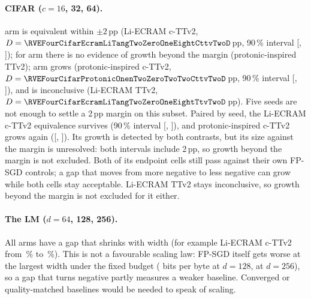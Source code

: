 \paragraph{CIFAR ($c=16$, 32, 64).} \RVEFourCifarNEquivalent{} arm is equivalent within $\pm2$\,pp (Li-ECRAM c-TTv2,
$D=\RVEFourCifarEcramLiTangTwoZeroOneEightCttvTwoD$\,pp, 90\,\% interval [\RVEFourCifarEcramLiTangTwoZeroOneEightCttvTwoLo,
\RVEFourCifarEcramLiTangTwoZeroOneEightCttvTwoHi]); for \RVEFourCifarNNoEvidenceOfGrowthBeyondTheMargin{} arm there is no evidence
of growth beyond the margin (protonic-inspired TTv2); \RVEFourCifarNGrows{} arm grows (protonic-inspired c-TTv2,
$D=\RVEFourCifarProtonicOnenTwoZeroTwoTwoCttvTwoD$\,pp, 90\,\% interval [\RVEFourCifarProtonicOnenTwoZeroTwoTwoCttvTwoLo,
\RVEFourCifarProtonicOnenTwoZeroTwoTwoCttvTwoHi]), and \RVEFourCifarNInconclusive{} is inconclusive (Li-ECRAM TTv2,
$D=\RVEFourCifarEcramLiTangTwoZeroOneEightTtvTwoD$\,pp).
Five seeds are not enough to settle a 2\,pp margin on this subset. Paired by seed, the Li-ECRAM c-TTv2 equivalence survives
(90\,\% interval [\RVEFourCifarEcramLiTangTwoZeroOneEightCttvTwoPairedLo, \RVEFourCifarEcramLiTangTwoZeroOneEightCttvTwoPairedHi]),
and protonic-inspired c-TTv2 grows again ([\RVEFourCifarProtonicOnenTwoZeroTwoTwoCttvTwoPairedLo,
\RVEFourCifarProtonicOnenTwoZeroTwoTwoCttvTwoPairedHi]). Its growth is detected by both contrasts, but its size against the
margin is unresolved: both intervals include 2\,pp, so growth beyond the margin is not excluded. Both of its
endpoint cells still pass against their own FP-SGD controls; a gap that moves from more negative to less negative can grow while
both cells stay acceptable. Li-ECRAM TTv2 stays inconclusive, so growth beyond the margin is not excluded for it either.

\paragraph{The LM ($d=64$, 128, 256).} All \RVEFourLmNShrinks{} arms have a gap that shrinks with width (for example Li-ECRAM
c-TTv2 from \RVEFourLmEcramLiTangTwoZeroOneEightCttvTwoWSixFourGap\,\% to \RVEFourLmEcramLiTangTwoZeroOneEightCttvTwoWTwoFiveSixGap\,\%).
This is not a favourable scaling law: FP-SGD itself gets worse at the largest width under the fixed budget
(\RVEFourLmFpWOneTwoEight{} bits per byte at $d=128$, \RVEFourLmFpWTwoFiveSix{} at $d=256$), so a gap that turns negative partly
measures a weaker baseline. Converged or quality-matched baselines would be needed to speak of scaling.

